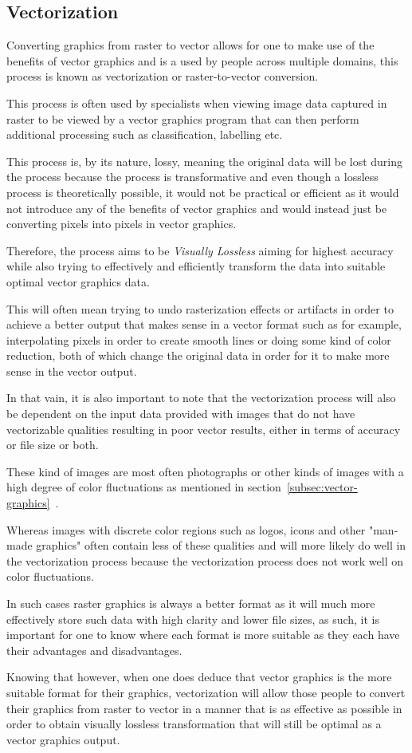 \documentclass[12pt]{article}
\newcommand{\sentence}{} %
\newcommand{\italic}[1]{\textit{#1}}
\newcommand{\fullref}[1]{\ref{#1}~\nameref{#1}}
\begin{document}
    \subsection{Vectorization}\label{subsec:vectorization}

    \tab
    Converting graphics from raster to vector allows for one to make use of the benefits of vector graphics and is a
    used by people across multiple domains, this process is known as vectorization or raster-to-vector conversion.
    \sentence
    This process is often used by specialists when viewing image data captured in raster to be viewed by a vector
    graphics program that can then perform additional processing such as classification, labelling etc.
    \sentence
    This process is, by its nature, lossy, meaning the original data will be lost during the process because the
    process is transformative and even though a lossless process is theoretically possible, it would not be practical
    or efficient as it would not introduce any of the benefits of vector graphics and would instead just be
    converting pixels into pixels in vector graphics\cite{vectortoraster}.
    \sentence
    Therefore, the process aims to be \italic{Visually Lossless} aiming for highest accuracy while also trying to
    effectively and efficiently transform the data into suitable optimal vector graphics data\cite{vectortoraster}.
    \sentence
    This will often mean trying to undo rasterization effects or artifacts in order to achieve a better output that
    makes sense in a vector format such as for example, interpolating pixels in order to create smooth lines
    or doing some kind of color reduction, both of which change the original data in order for it to make more sense
    in the vector output.

    \bigskip
    \sentence
    In that vain, it is also important to note that the vectorization process will also be dependent on the input
    data provided with images that do not have vectorizable qualities resulting in poor vector results, either in
    terms of accuracy or file size or both.
    \sentence
    These kind of images are most often photographs or other kinds of images with a high degree of color fluctuations
    as mentioned in section~\fullref{subsec:vector-graphics}.
    \sentence
    Whereas images with discrete color regions such as logos, icons and other "man-made graphics" often contain less
    of these qualities and will more likely do well in the vectorization process because the vectorization process
    does not work well on color fluctuations.
    \sentence
    In such cases raster graphics is always a better format as it will much more effectively store such data with
    high clarity and lower file sizes, as such, it is important for one to know where each format is more suitable as
    they each have their advantages and disadvantages.
    \sentence
    Knowing that however, when one does deduce that vector graphics is the more suitable format for their graphics,
    vectorization will allow those people to convert their graphics from raster to vector in a manner that is as
    effective as possible in order to obtain visually lossless transformation that will still be optimal as a vector
    graphics output.
\end{document}
